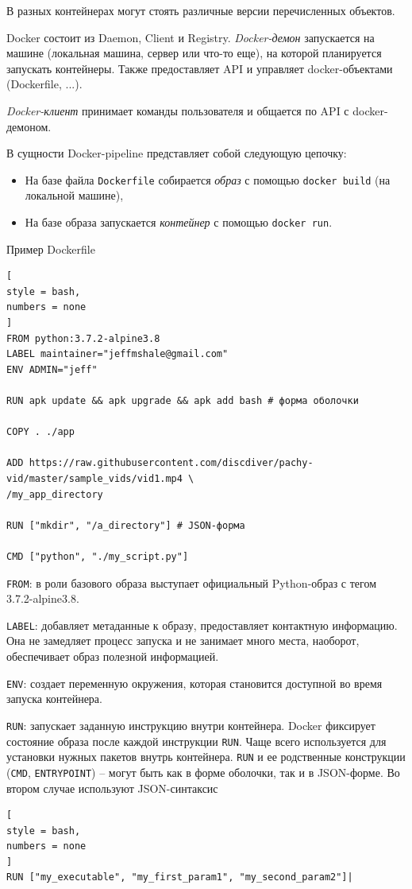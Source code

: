 \documentclass[%
	11pt,
	a4paper,
	utf8,
		]{article}
\begin{document}
В разных контейнерах могут стоять различные версии перечисленных объектов.

Docker состоит из Daemon, Client и Registry. \emph{Docker-демон} запускается на машине (локальная машина, сервер или что-то еще), на которой планируется запускать контейнеры. Также предоставляет API и управляет docker-объектами (Dockerfile, ...).

\emph{Docker-клиент} принимает команды пользователя и общается по API с docker-демоном.

В сущности Docker-pipeline представляет собой следующую цепочку:
\begin{itemize}
	\item На базе файла \texttt{Dockerfile} собирается \emph{образ} с помощью \texttt{docker build} (на локальной машине),
	
	\item На базе образа запускается \emph{контейнер} с помощью \texttt{docker run}.
\end{itemize}

Пример Dockerfile
\begin{lstlisting}[
style = bash,
numbers = none	
]
FROM python:3.7.2-alpine3.8
LABEL maintainer="jeffmshale@gmail.com"
ENV ADMIN="jeff"

RUN apk update && apk upgrade && apk add bash # форма оболочки

COPY . ./app

ADD https://raw.githubusercontent.com/discdiver/pachy-vid/master/sample_vids/vid1.mp4 \
/my_app_directory

RUN ["mkdir", "/a_directory"] # JSON-форма

CMD ["python", "./my_script.py"]
\end{lstlisting}

\texttt{FROM}: в роли базового образа выступает официальный Python-образ с тегом 3.7.2-alpine3.8. 

\texttt{LABEL}: добавляет метаданные к образу, предоставляет контактную информацию. Она не замедляет процесс запуска и не занимает много места, наоборот, обеспечивает образ полезной информацией.

\texttt{ENV}: создает переменную окружения, которая становится доступной во время запуска контейнера. 

\texttt{RUN}: запускает заданную инструкцию внутри контейнера. Docker фиксирует состояние образа после каждой инструкции \texttt{RUN}. Чаще всего используется для установки нужных пакетов внутрь контейнера. \texttt{RUN} и ее родственные конструкции (\texttt{CMD}, \texttt{ENTRYPOINT}) -- могут быть как в форме оболочки, так и в JSON-форме. Во втором случае используют JSON-синтаксис 
\begin{lstlisting}[
style = bash,
numbers = none	
]
RUN ["my_executable", "my_first_param1", "my_second_param2"]|
\end{lstlisting}
\end{document}
